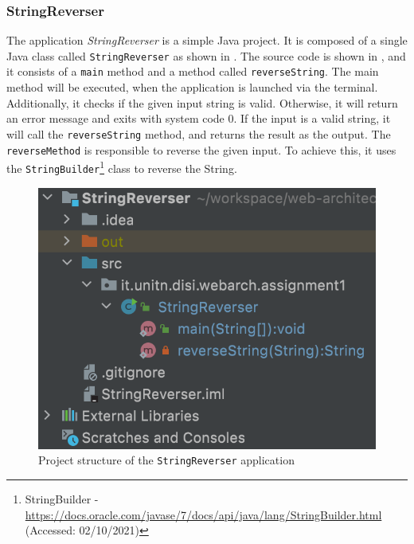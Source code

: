 \subsubsection{StringReverser}\label{subsubsec:01_part1_impl_stringreverser}
The application \textit{StringReverser} is a simple Java project. It is composed of a single Java class called \texttt{StringReverser} as shown in .
The source code is shown in , and it consists of a \texttt{main} method and a method called \texttt{reverseString}.
The main method will be executed, when the application is launched via the terminal. Additionally, it checks if the given input string is valid. Otherwise, it will return an error message and exits with system code 0. If the input is a valid string, it will call the \texttt{reverseString} method, and returns the result as the output.
The \texttt{reverseMethod} is responsible to reverse the given input. To achieve this, it uses the \texttt{StringBuilder}\footnote{StringBuilder - \url{https://docs.oracle.com/javase/7/docs/api/java/lang/StringBuilder.html} (Accessed: 02/10/2021)} class to reverse the String.

\begin{figure}[h]
\centering
\includegraphics[scale=0.4]{images/StringReverserStrct}
\caption{Project structure of the \texttt{StringReverser} application}
\label{fig:01_part1_impl_stringreverser_structure}
\end{figure}

